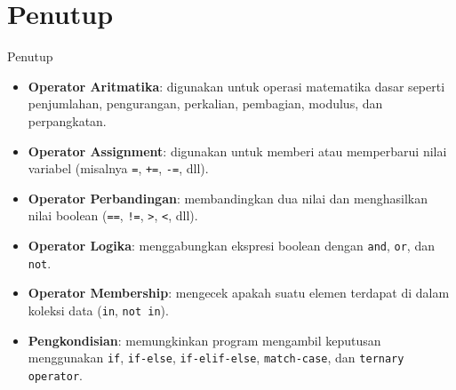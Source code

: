 \documentclass[aspectratio=169, table]{beamer}
\begin{document}
\section{Penutup}

\begin{frame}{Penutup}
\begin{itemize}
    \item \textbf{Operator Aritmatika}: digunakan untuk operasi matematika dasar seperti penjumlahan, pengurangan, perkalian, pembagian, modulus, dan perpangkatan.
    \item \textbf{Operator Assignment}: digunakan untuk memberi atau memperbarui nilai variabel (misalnya \texttt{=}, \texttt{+=}, \texttt{-=}, dll).
    \item \textbf{Operator Perbandingan}: membandingkan dua nilai dan menghasilkan nilai boolean (\texttt{==}, \texttt{!=}, \texttt{>}, \texttt{<}, dll).
    \item \textbf{Operator Logika}: menggabungkan ekspresi boolean dengan \texttt{and}, \texttt{or}, dan \texttt{not}.
    \item \textbf{Operator Membership}: mengecek apakah suatu elemen terdapat di dalam koleksi data (\texttt{in}, \texttt{not in}).
    \item \textbf{Pengkondisian}: memungkinkan program mengambil keputusan menggunakan \texttt{if}, \texttt{if-else}, \texttt{if-elif-else}, \texttt{match-case}, dan \texttt{ternary operator}.
\end{itemize}
\end{frame}
\end{document}
